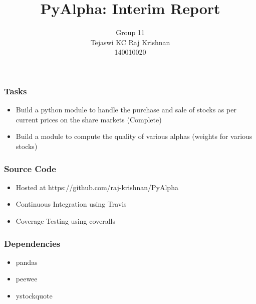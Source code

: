 \documentclass[serif,mathserif]{beamer}
\author[Tejaswi KC, Raj Krishnan]{Group 11 \\ Tejaswi KC \quad Raj Krishnan \\ 140010020 \quad 140010007}
\title[PyAlpha\hspace{2em}\insertframenumber/\inserttotalframenumber]{PyAlpha: Interim Report}
\institute{Indian Institute of Technology, Bombay}
\begin{document}
  \maketitle

  \begin{frame}
    \frametitle{Tasks}
    \begin{itemize}
      \item Build a python module to handle the purchase and sale of stocks
       as per current prices on the share markets (Complete)
      \item Build a module to compute the quality of various alphas (weights
       for various stocks)
    \end{itemize}
  \end{frame}

  \begin{frame}
    \frametitle{Source Code}
    \begin{itemize}
      \item Hosted at https://github.com/raj-krishnan/PyAlpha
      \item Continuous Integration using Travis
      \item Coverage Testing using coveralls
      \end{itemize}
  \end{frame}

  \begin{frame}
    \frametitle{Dependencies}
    \begin{itemize}
      \item pandas
      \item peewee
      \item ystockquote
    \end{itemize}
  \end{frame}

  
\end{document}

